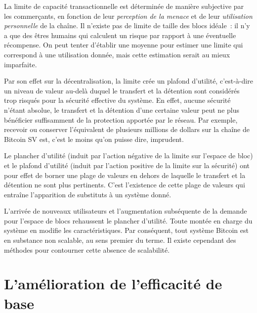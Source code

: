 La limite de capacité transactionnelle est déterminée de manière subjective par les commerçants, en fonction de leur \emph{perception de la menace} et de leur \emph{utilisation personnelle} de la chaîne. Il n'existe pas de limite de taille des blocs idéale~: il n'y a que des êtres humains qui calculent un risque par rapport à une éventuelle récompense. On peut tenter d'établir une moyenne pour estimer une limite qui correspond à une utilisation donnée, mais cette estimation serait au mieux imparfaite.

Par son effet sur la décentralisation, la limite crée un plafond d'utilité, c'est-à-dire un niveau de valeur au-delà duquel le transfert et la détention sont considérés trop risqués pour la sécurité effective du système. En effet, aucune sécurité n'étant absolue, le transfert et la détention d'une certaine valeur peut ne plus bénéficier suffisamment de la protection apportée par le réseau. Par exemple, recevoir ou conserver l'équivalent de plusieurs millions de dollars sur la chaîne de Bitcoin SV est, c'est le moins qu'on puisse dire, imprudent.

Le plancher d'utilité (induit par l'action négative de la limite sur l'espace de bloc) et le plafond d'utilité (induit par l'action positive de la limite sur la sécurité) ont pour effet de borner une plage de valeurs en dehors de laquelle le transfert et la détention ne sont plus pertinents. C'est l'existence de cette plage de valeurs qui entraîne l'apparition de substituts à un système donné.

L'arrivée de nouveaux utilisateurs et l'augmentation subséquente de la demande pour l'espace de blocs rehaussent le plancher d'utilité. Toute montée en charge du système en modifie les caractéristiques. Par conséquent, tout système Bitcoin est en substance non scalable, au sens premier du terme. Il existe cependant des méthodes pour contourner cette absence de scalabilité.

\section*{L'amélioration de l'efficacité de base}


